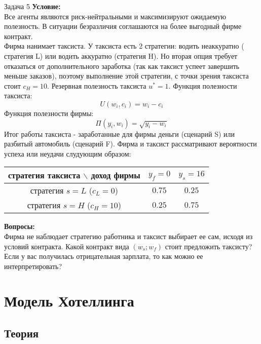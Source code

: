 \begin{mybox}{Задача 5}
\indent\setlength{\parindent}{1em}\textbf{Условие:}\\
    \indent\setlength{\parindent}{1em}Все агенты являются риск-нейтральными и максимизируют ожидаемую полезность. В ситуации безразличия соглашаются на
    более выгодный фирме контракт.\\
    \indent\setlength{\parindent}{1em}Фирма нанимает таксиста. У таксиста есть 2 стратегии: водить неаккуратно (
стратегия L) или водить аккуратно (стратегия H). Но вторая опция
    требует отказаться от дополнительного заработка (так как таксист успеет завершить меньше заказов), поэтому
выполнение этой стратегии, с точки зрения таксиста
    стоит $c_H=10$. Резервная полезность таксиста $u^*=1$. Функция полезности таксиста: $$U(w_i,c_i)=w_i-c_i$$
\indent\setlength{\parindent}{1em}Функция полезности фирмы: $$\Pi(y_i,w_i)=\sqrt{y_i-w_i}$$
    \indent\setlength{\parindent}{1em}Итог работы таксиста - заработанные для фирмы деньги (сценарий
S) или разбитый автомобиль (сценарий F). Фирма и таксист рассматривают вероятности успеха или неудачи слудующим образом:
    \\\begin{center}
    \begin{tabular}{ c|c|c }
     стратегия таксиста $\backslash$ доход фирмы & $y_f=0$ & $y_s=16$ \\
     \hline
     стратегия $s=L$ ($c_L=0$) & $0.75$ & $0.25$ \\
     \hline
     стратегия $s=H$ ($c_H=10$) & $0.25$ & $0.75$ \\
    \end{tabular}
    \end{center}
    \indent\setlength{\parindent}{1em}\textbf{Вопросы:}\\
    \indent\setlength{\parindent}{1em}Фирма не наблюдает стратегию работника и таксист
    выбирает ее сам, исходя из условий контракта. Какой контракт вида $(w_s;w_f)$ стоит предложить таксисту? Если у
вас получилась отрицательная зарплата, то как можно ее интерпретировать?\\
\end{mybox}


\chapter{Модель Хотеллинга}
\section{Теория}

